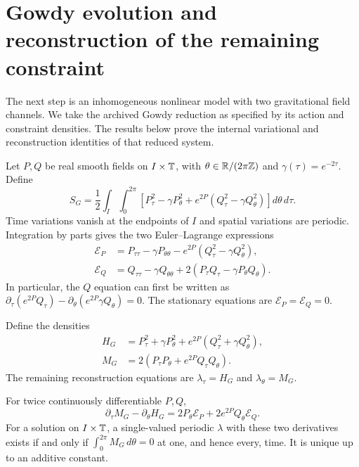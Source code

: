 \section{Gowdy evolution and reconstruction of the remaining constraint}
\label{c:core:gowdy}

The next step is an inhomogeneous nonlinear model with two gravitational
field channels. We take the archived Gowdy reduction as specified by its
action and constraint densities. The results below prove the internal
variational and reconstruction identities of that reduced system.

Let $P,Q$ be real smooth fields on $I\times\mathbb T$, with
$\theta\in\mathbb R/(2\pi\mathbb Z)$ and $\gamma(\tau)=e^{-2\tau}$. Define
\begin{equation}
 S_G=\frac12\int_I\int_0^{2\pi}
 \left[P_\tau^2-\gamma P_\theta^2
 +e^{2P}(Q_\tau^2-\gamma Q_\theta^2)\right]d\theta\,d\tau.
 \label{c:core:gowdy-action}
\end{equation}
Time variations vanish at the endpoints of $I$ and spatial variations
are periodic. Integration by parts gives the two Euler--Lagrange
expressions
\begin{align}
 \mathcal E_P&=P_{\tau\tau}-\gamma P_{\theta\theta}
 -e^{2P}(Q_\tau^2-\gamma Q_\theta^2),\nonumber\\
 \mathcal E_Q&=Q_{\tau\tau}-\gamma Q_{\theta\theta}
 +2(P_\tau Q_\tau-\gamma P_\theta Q_\theta).
 \label{c:core:gowdy-euler}
\end{align}
In particular, the $Q$ equation can first be written as
$\partial_\tau(e^{2P}Q_\tau)-\partial_\theta(e^{2P}\gamma Q_\theta)=0$.
The stationary equations are $\mathcal E_P=\mathcal E_Q=0$.

Define the densities
\begin{align}
 H_G&=P_\tau^2+\gamma P_\theta^2
 +e^{2P}(Q_\tau^2+\gamma Q_\theta^2),\nonumber\\
 M_G&=2(P_\tau P_\theta+e^{2P}Q_\tau Q_\theta).
 \label{c:core:gowdy-densities}
\end{align}
The remaining reconstruction equations are
$\lambda_\tau=H_G$ and $\lambda_\theta=M_G$.

\begin{proposition}
\label{c:core:gowdy-integrability}
For twice continuously differentiable $P,Q$,
\begin{equation}
 \partial_\tau M_G-\partial_\theta H_G
 =2P_\theta\mathcal E_P+2e^{2P}Q_\theta\mathcal E_Q.
 \label{c:core:gowdy-identity}
\end{equation}
For a solution on $I\times\mathbb T$, a single-valued periodic $\lambda$ with
these two derivatives exists if and only if
$\int_0^{2\pi}M_G\,d\theta=0$ at one, and hence every, time. It is
unique up to an additive constant.
\end{proposition}

